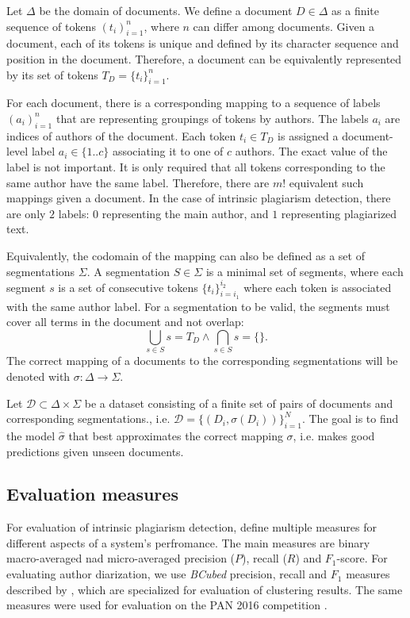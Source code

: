 \documentclass[10pt, a4paper]{article}
\begin{document}
Let $\Delta$ be the domain of documents. We define a document $D\in \Delta$ as a finite sequence of tokens $(t_i)_{i=1}^n$, where $n$ can differ among documents. Given a document, each of its tokens is unique and defined by its character sequence and position in the document. Therefore, a document can be equivalently represented by its set of tokens $T_D=\{t_i\}_{i=1}^n$.

For each document, there is a corresponding mapping to a sequence of labels $(a_i)_{i=1}^n$ that are representing groupings of tokens by authors. The labels $a_i$ are indices of authors of the document. Each token $t_i\in T_D$ is assigned a document-level label $a_i \in \{1..c\}$ associating it to one of $c$ authors. The exact value of the label is not important. It is only required that all tokens corresponding to the same author have the same label. Therefore, there are $m!$ equivalent such mappings given a document. In the case of intrinsic plagiarism detection, there are only $2$ labels: $0$ representing the main author, and $1$ representing plagiarized text.

Equivalently, the codomain of the mapping can also be defined as a set of segmentations $\Sigma$. A segmentation $S\in \Sigma$ is a minimal set of segments, where each segment $s$ is a set of consecutive tokens $\{t_i\}_{i=i_1}^{i_2}$ where each token is associated with the same author label. For a segmentation to be valid, the segments must cover all terms in the document and not overlap:
\begin{equation}
	\bigcup_{s\in S}s = T_D  \wedge \bigcap_{s\in S}s = \{\}.
\end{equation}
The correct mapping of a documents to the corresponding segmentations will be denoted with $\sigma: \Delta\rightarrow\Sigma$.

Let $\mathcal{D} \subset \Delta\times\Sigma$ be a dataset consisting of a finite set of pairs of documents and corresponding segmentations., i.e. $\mathcal{D} = \{\left(D_i, \sigma(D_i)\right)\}_{i=1}^N$. The goal is to find the model $\hat{\sigma}$ that best approximates the correct mapping $\sigma$, i.e. makes good predictions given unseen documents.

\subsection{Evaluation measures}

For evaluation of intrinsic plagiarism detection, \citet{stein-2010} define multiple measures for different aspects of a system's perfromance. The main measures are binary macro-averaged nad micro-averaged precision ($P$), recall ($R$) and $F_1$-score. For evaluating author diarization, we use \emph{BCubed} precision, recall and $F_1$ measures described by \citet{amigo-2009}, which are specialized for evaluation of clustering results. The same measures were used for evaluation on the PAN 2016 competition \citep{rosso-2016}.
\end{document}
